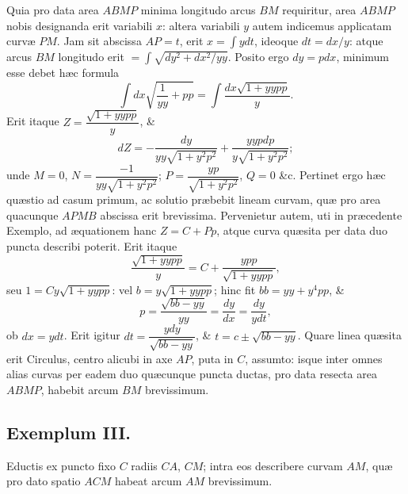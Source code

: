 Quia pro data area $ABMP$ minima longitudo arcus $BM$ requiritur, area $ABMP$ nobis designanda erit variabili $x$: altera variabili $y$ autem indicemus applicatam curvæ $PM$. Jam sit abscissa $AP=t$, erit $x=\int ydt$, ideoque $dt=dx/y$: atque arcus $BM$ longitudo erit $=\int\sqrt{dy^2+dx^2/yy}$. Posito ergo $dy=pdx$, minimum esse debet hæc formula
\[\int dx\sqrt{\frac{1}{yy}+pp}=\int\frac{dx\sqrt{1+yypp}}{y}.\]
Erit itaque $Z=\dfrac{\sqrt{1+yypp}}{y}$, \&
\[dZ=-\frac{dy}{yy\sqrt{1+y^2p^2}}+\frac{yypdp}{y\sqrt{1+y^2p^2}};\]
unde $M=0$, $N=\dfrac{-1}{yy\sqrt{1+y^2p^2}}$; $P=\dfrac{yp}{\sqrt{1+y^2p^2}}$, $Q=0$ \&c. Pertinet ergo hæc quæstio ad casum primum, ac solutio præbebit lineam curvam, quæ pro area quacunque $APMB$ abscissa erit brevissima. Pervenietur autem, uti in præcedente Exemplo, ad æquationem hanc $Z=C+Pp$, atque curva quæsita per data duo puncta describi poterit. Erit itaque
\[\frac{\sqrt{1+yypp}}{y}=C+\frac{ypp}{\sqrt{1+yypp}},\]
seu $1=Cy\sqrt{1+yypp}$: vel $b=y\sqrt{1+yypp}$; hinc fit $bb=yy+y^4pp$, \&
\[p=\frac{\sqrt{bb-yy}}{yy}=\frac{dy}{dx}=\frac{dy}{ydt},\]
ob $dx=ydt$. Erit igitur $dt=\dfrac{ydy}{\sqrt{bb-yy}}$, \& $t=c\pm\sqrt{bb-yy}$. Quare linea quæsita erit Circulus, centro alicubi in axe $AP$, puta in $C$, assumto: isque inter omnes alias curvas per eadem duo quæcunque puncta ductas, pro data resecta area $ABMP$, habebit arcum $BM$ brevissimum.
\subsection*{Exemplum III.}
Eductis ex puncto fixo $C$ radiis $CA$, $CM$; intra eos describere curvam $AM$, quæ pro dato spatio $ACM$ habeat arcum $AM$ brevissimum.

